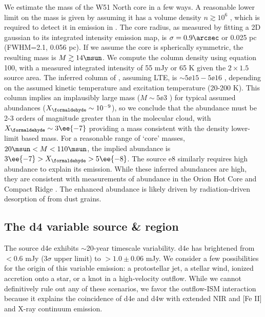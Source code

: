 We estimate the mass of the W51 North core in a few ways.  A reasonable lower limit
on the mass is given by assuming it has a volume density $n\gtrsim10^6$ \percc,
which is required to detect it in emission in \ortho \twotwo
\citep{Mangum1993a}.  The core radius, as measured by fitting a 2D gaussian to
its integrated intensity emission map, is
$\sigma=0.9\arcsec$ or 0.025 pc (FWHM=2.1\arcsec, 0.056 pc).  If we assume the core
is spherically symmetric, the resulting mass is $M\gtrsim14\msun$.
We compute the \ortho \twotwo column density using \citet{Mangum2015a} equation
100, with a measured integrated intensity of 55 mJy \kms or 65 K \kms given
the $2\times1.5$\arcsec source area.  The inferred column of \ortho,
assuming LTE, is $\sim5\ee{15} - 5\ee{16}$ \persc, depending on the assumed
kinetic temperature and excitation temperature (20-200 K).  This \formaldehyde column
implies an implausibly large mass ($M\sim5\ee{3}$ \msun) for typical assumed abundances
($X_{\formaldehyde}\sim10^{-9}$), so we conclude that the \formaldehyde abundance
must be 2-3 orders of magnitude greater than in the molecular cloud, with
$X_{\formaldehyde}\sim3\ee{-7}$ providing a mass consistent with the density
lower-limit based mass.  For a reasonable range of `core' masses, $20
\msun<M<110 \msun$, the implied abundance is $3\ee{-7} > X_{\formaldehyde} >
5\ee{-8}$.  The source e8 similarly requires high abundance to explain its
emission.  While these inferred abundances are high, they are consistent with
measurements of \formaldehyde abundance in the Orion Hot Core and Compact Ridge
\citep{Mangum1993b}.  The enhanced abundance is likely driven by radiation-driven
desorption of \formaldehyde from dust grains.






\subsection{The d4 variable source \& \hh region}
\label{sec:d4}
The source d4e exhibits $\sim$20-year timescale variability.  d4e has
brightened from $<0.6$ mJy ($3\sigma$ upper limit) to $>1.0\pm0.06$ mJy.  We
consider a few possibilities for the origin of this variable emission: a
protostellar jet,  a stellar wind, ionized accretion onto a star, or a knot in
a high-velocity outflow.  While we cannot definitively rule out any of these
scenarios, we favor the outflow-ISM interaction because it explains the
coincidence of d4e and d4w with extended NIR \hh and [Fe II] and X-ray
continuum emission.

